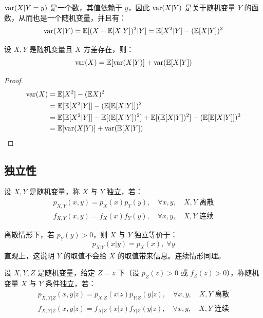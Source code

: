 \begin{note}
$\mathrm{var}(X\vert Y=y)$ 是一个数，其值依赖于 $y$，因此 $\mathrm{var}(X\vert Y)$ 是关于随机变量 $Y$ 的函数，从而也是一个随机变量，并且有：
\[
\mathrm{var}(X\vert Y)=\mathbb{E}[(X-\mathbb{E}[X\vert Y])^2\vert Y]=\mathbb{E}[X^2\vert Y]-(\mathbb{E}[X\vert Y])^2
\]
\end{note}

\begin{theorem}[全方差公式]
设 $X,Y$ 是随机变量且 $X$ 方差存在，则：
\[
\mathrm{var}(X)=\mathbb{E}[\mathrm{var}(X\vert Y)]+\mathrm{var}(\mathbb{E}[X\vert Y])
\]
\end{theorem}
\begin{proof}
\begin{align*}
\mathrm{var}(X)&=\mathbb{E}[X^2]-(\mathbb{E} X)^2\\
&=\mathbb{E}[\mathbb{E}[X^2\vert Y]]-(\mathbb{E}[\mathbb{E}[X\vert Y]])^2\\
&=\mathbb{E}[\mathbb{E}[X^2\vert Y]]-\mathbb{E}[(\mathbb{E}[X\vert Y])^2]+\mathbb{E}[(\mathbb{E}[X\vert Y])^2]-(\mathbb{E}[\mathbb{E}[X\vert Y]])^2\\
&=\mathbb{E}[\mathrm{var}(X\vert Y)]+\mathrm{var}(\mathbb{E}[X\vert Y])
\end{align*}
\end{proof}


\subsection{独立性}

\begin{definition}[独立]
设 $X,Y$ 是随机变量，称 $X$ 与 $Y$ 独立，若：
\begin{gather*}
p_{X,Y}(x,y)=p_X(x)p_Y(y),\quad\forall x,y,\quad\text{$X,Y$ 离散}\\
f_{X,Y}(x,y)=f_X(x)f_Y(y),\quad\forall x,y,\quad\text{$X,Y$ 连续}
\end{gather*}
\end{definition}
\begin{com}
离散情形下，若 $p_Y(y)>0$，则 $X$ 与 $Y$ 独立等价于：
\[p_{X\vert Y}(x\vert y)=p_X(x),\;\forall y\]
直观上，这说明 $Y$ 的取值不会给 $X$ 的取值带来信息。连续情形同理。
\end{com}

\begin{definition}[条件独立]
设 $X,Y,Z$ 是随机变量，给定 $Z=z$ 下（设 $p_Z(z)>0$ 或 $f_Z(z)>0$），称随机变量 $X$ 与 $Y$ 条件独立，若：
\begin{gather*}
p_{X,Y\vert Z}(x,y\vert z)=p_{X\vert Z}(x\vert z)p_{Y\vert Z}(y\vert z),\quad\forall x,y,\quad\text{$X,Y$ 离散}\\
f_{X,Y\vert Z}(x,y\vert z)=f_{X\vert Z}(x\vert z)f_{Y\vert Z}(y\vert z),\quad\forall x,y,\quad\text{$X,Y$ 连续}
\end{gather*}
\end{definition}

